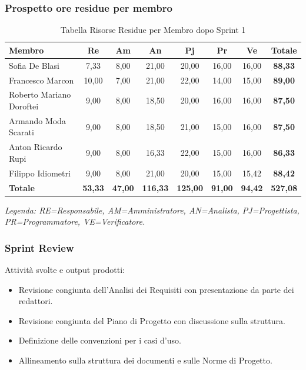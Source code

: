 \subsubsection{Prospetto ore residue per membro}
\begin{table}[H]
    \centering
    \renewcommand{\arraystretch}{1.3}
    \begin{tabularx}{\textwidth}{|X|c|c|c|c|c|c|c|}
        \hline
        \textbf{Membro} & \textbf{Re} & \textbf{Am} & \textbf{An} & \textbf{Pj} & \textbf{Pr} & \textbf{Ve} & \textbf{Totale} \\
        \hline
        Sofia De Blasi & 7,33 & 8,00 & 21,00 & 20,00 & 16,00 & 16,00 & \textbf{88,33} \\
        Francesco Marcon & 10,00 & 7,00 & 21,00 & 22,00 & 14,00 & 15,00 & \textbf{89,00} \\
        Roberto Mariano Doroftei & 9,00 & 8,00 & 18,50 & 20,00 & 16,00 & 16,00 & \textbf{87,50} \\
        Armando Moda Scarati & 9,00 & 8,00 & 18,50 & 21,00 & 15,00 & 16,00 & \textbf{87,50} \\
        Anton Ricardo Rupi & 9,00 & 8,00 & 16,33 & 22,00 & 15,00 & 16,00 & \textbf{86,33} \\
        Filippo Idiometri & 9,00 & 8,00 & 21,00 & 20,00 & 15,00 & 15,42 & \textbf{88,42} \\
        \hline
        \textbf{Totale} & \textbf{53,33} & \textbf{47,00} & \textbf{116,33} & \textbf{125,00} & \textbf{91,00} & \textbf{94,42} & \textbf{527,08} \\
        \hline
    \end{tabularx}
    \begin{minipage}{\textwidth}
        \smallskip
        \footnotesize\textit{Legenda: RE=Responsabile, AM=Amministratore,
        AN=Analista, PJ=Progettista, PR=Programmatore, VE=Verificatore.}
    \end{minipage}
    \caption{Tabella Risorse Residue per Membro dopo Sprint 1}
\end{table}

\subsubsection{Sprint Review}
Attività svolte e output prodotti:
\begin{itemize}
    \item Revisione congiunta dell'Analisi dei Requisiti con presentazione da
          parte dei redattori.
    \item Revisione congiunta del Piano di Progetto con discussione sulla
          struttura.
    \item Definizione delle convenzioni per i casi d'uso.
    \item Allineamento sulla struttura dei documenti e sulle Norme di Progetto.
\end{itemize}

